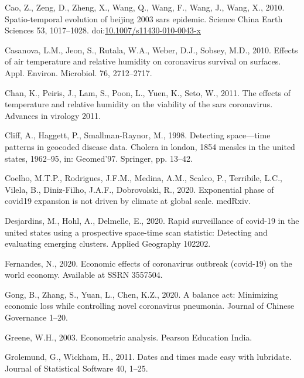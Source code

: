 \documentclass[]{elsarticle} %
\begin{document}
\leavevmode\hypertarget{ref-Cao2010spatio}{}%
Cao, Z., Zeng, D., Zheng, X., Wang, Q., Wang, F., Wang, J., Wang, X.,
2010. Spatio-temporal evolution of beijing 2003 sars epidemic. Science
China Earth Sciences 53, 1017--1028.
doi:\href{https://doi.org/10.1007/s11430-010-0043-x}{10.1007/s11430-010-0043-x}

\leavevmode\hypertarget{ref-Casanova2010effects}{}%
Casanova, L.M., Jeon, S., Rutala, W.A., Weber, D.J., Sobsey, M.D., 2010.
Effects of air temperature and relative humidity on coronavirus survival
on surfaces. Appl. Environ. Microbiol. 76, 2712--2717.

\leavevmode\hypertarget{ref-Chan2011effects}{}%
Chan, K., Peiris, J., Lam, S., Poon, L., Yuen, K., Seto, W., 2011. The
effects of temperature and relative humidity on the viability of the
sars coronavirus. Advances in virology 2011.

\leavevmode\hypertarget{ref-Cliff1998detecting}{}%
Cliff, A., Haggett, P., Smallman-Raynor, M., 1998. Detecting
space---time patterns in geocoded disease data. Cholera in london, 1854
measles in the united states, 1962--95, in: Geomed'97. Springer, pp.
13--42.

\leavevmode\hypertarget{ref-Coelho2020exponential}{}%
Coelho, M.T.P., Rodrigues, J.F.M., Medina, A.M., Scalco, P., Terribile,
L.C., Vilela, B., Diniz-Filho, J.A.F., Dobrovolski, R., 2020.
Exponential phase of covid19 expansion is not driven by climate at
global scale. medRxiv.

\leavevmode\hypertarget{ref-Desjardins2020rapid}{}%
Desjardins, M., Hohl, A., Delmelle, E., 2020. Rapid surveillance of
covid-19 in the united states using a prospective space-time scan
statistic: Detecting and evaluating emerging clusters. Applied Geography
102202.

\leavevmode\hypertarget{ref-Fernandes2020economic}{}%
Fernandes, N., 2020. Economic effects of coronavirus outbreak (covid-19)
on the world economy. Available at SSRN 3557504.

\leavevmode\hypertarget{ref-Gong2020balance}{}%
Gong, B., Zhang, S., Yuan, L., Chen, K.Z., 2020. A balance act:
Minimizing economic loss while controlling novel coronavirus pneumonia.
Journal of Chinese Governance 1--20.

\leavevmode\hypertarget{ref-Greene2003econometric}{}%
Greene, W.H., 2003. Econometric analysis. Pearson Education India.

\leavevmode\hypertarget{ref-Grolemund2011dates}{}%
Grolemund, G., Wickham, H., 2011. Dates and times made easy with
lubridate. Journal of Statistical Software 40, 1--25.
\end{document}
